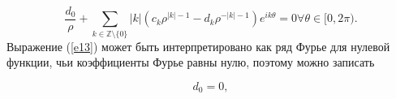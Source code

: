 \documentclass[a4paper, 12pt]{article}
\begin{document}
\begin{equation}\label{e13}
\frac{d_0}{\rho} + \sum_{k \in \mathbb{Z} \setminus \{0\}}{|k|(c_k \rho^{|k|-1} - d_k \rho^{-|k|-1})e^{ik\theta}} = 0 \forall \theta \in [0, 2 \pi).
\end{equation}
Выражение (\ref{e13}) может быть интерпретировано как ряд Фурье для нулевой функции, чьи коэффициенты Фурье равны нулю, поэтому можно записать

\begin{equation}
d_0 = 0,
\end{equation}
\end{document}
